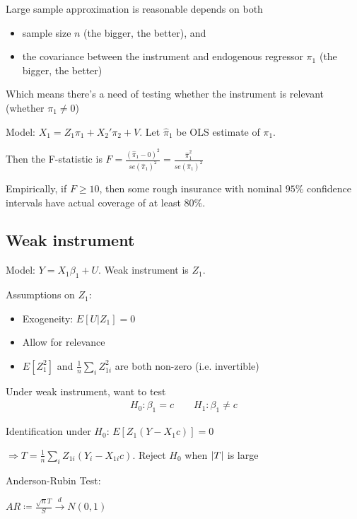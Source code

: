 \documentclass[10pt,landscape]{article}
\begin{document}
\begin{multicols}{3}
Large sample approximation is reasonable depends on both 
\begin{itemize}
  \item sample size $n$ (the bigger, the better), and
  \item the covariance between the instrument and endogenous regressor $\pi_1$ (the bigger, the better)
\end{itemize}

Which means there's a need of testing whether the instrument is relevant (whether $\pi_1 \neq 0$)

\begin{adjustwidth}{.3cm}{0cm}
  Model: $X_1 = Z_1 \pi_1 + X_2' \pi_2 + V$. Let $\hat{\pi}_1$ be OLS estimate of $\pi_1$. 

  Then the F-statistic is $F = \frac{(\hat{\pi}_1 - 0)^2}{se({\hat{\pi}_1})^2} = \frac{\hat{\pi}_1^2}{se({\hat{\pi}_1})^2}$

  Empirically, if $F \geq 10$, then some rough insurance with nominal $95\%$ conﬁdence intervals have actual coverage of at least $80\%$.
\end{adjustwidth}

\subsection{Weak instrument}

Model: $Y = X_1 \beta_1 + U$. Weak instrument is $Z_1$. 

Assumptions on $Z_1$: 
\begin{itemize}
  \item Exogeneity: $E[U|Z_1] = 0$
  \item Allow for relevance
  \item $E[Z_1^2]$ and $\frac{1}{n} \sum_i Z_{1i}^2$ are both non-zero (i.e. invertible)
\end{itemize}

Under weak instrument, want to test
\begin{align*}
  H_0 : \beta_1 = c \quad \quad H_1 : \beta_1 \neq c
\end{align*}

Identification under $H_0$: $E[Z_1(Y - X_1 c)] = 0$

$\Rightarrow T = \frac{1}{n} \sum_i Z_{1i} (Y_i - X_{1i}c)$. Reject $H_0$ when $\left| T \right|$ is large

Anderson-Rubin Test: 

\begin{adjustwidth}{.3cm}{0cm}
$AR \coloneqq \frac{\sqrt{n}T}{S} \xrightarrow{d} N(0, 1)$


\end{adjustwidth}
\end{multicols}
\end{document}
